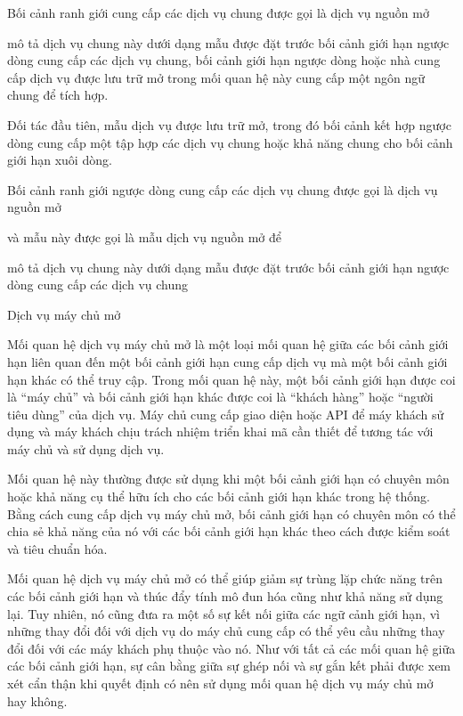 Bối cảnh ranh giới cung cấp các dịch vụ chung được gọi là dịch vụ nguồn mở

mô tả dịch vụ chung này dưới dạng mẫu được đặt trước bối cảnh giới hạn ngược dòng cung cấp các dịch vụ chung, bối cảnh giới hạn ngược dòng hoặc nhà cung cấp dịch vụ được lưu trữ mở trong mối quan hệ này cung cấp một ngôn ngữ chung để tích hợp.

Đối tác đầu tiên, mẫu dịch vụ được lưu trữ mở, trong đó bối cảnh kết hợp ngược dòng cung cấp một tập hợp các dịch vụ chung hoặc khả năng chung cho bối cảnh giới hạn xuôi dòng.


Bối cảnh ranh giới ngược dòng cung cấp các dịch vụ chung được gọi là dịch vụ nguồn mở

và mẫu này được gọi là mẫu dịch vụ nguồn mở để

mô tả dịch vụ chung này dưới dạng mẫu được đặt trước bối cảnh giới hạn ngược dòng cung cấp các dịch vụ chung





Dịch vụ máy chủ mở

Mối quan hệ dịch vụ máy chủ mở là một loại mối quan hệ giữa các bối cảnh giới hạn liên quan đến một bối cảnh giới hạn cung cấp dịch vụ mà một bối cảnh giới hạn khác có thể truy cập. Trong mối quan hệ này, một bối cảnh giới hạn được coi là “máy chủ” và bối cảnh giới hạn khác được coi là “khách hàng” hoặc “người tiêu dùng” của dịch vụ. Máy chủ cung cấp giao diện hoặc API để máy khách sử dụng và máy khách chịu trách nhiệm triển khai mã cần thiết để tương tác với máy chủ và sử dụng dịch vụ.

Mối quan hệ này thường được sử dụng khi một bối cảnh giới hạn có chuyên môn hoặc khả năng cụ thể hữu ích cho các bối cảnh giới hạn khác trong hệ thống. Bằng cách cung cấp dịch vụ máy chủ mở, bối cảnh giới hạn có chuyên môn có thể chia sẻ khả năng của nó với các bối cảnh giới hạn khác theo cách được kiểm soát và tiêu chuẩn hóa.

Mối quan hệ dịch vụ máy chủ mở có thể giúp giảm sự trùng lặp chức năng trên các bối cảnh giới hạn và thúc đẩy tính mô đun hóa cũng như khả năng sử dụng lại. Tuy nhiên, nó cũng đưa ra một số sự kết nối giữa các ngữ cảnh giới hạn, vì những thay đổi đối với dịch vụ do máy chủ cung cấp có thể yêu cầu những thay đổi đối với các máy khách phụ thuộc vào nó. Như với tất cả các mối quan hệ giữa các bối cảnh giới hạn, sự cân bằng giữa sự ghép nối và sự gắn kết phải được xem xét cẩn thận khi quyết định có nên sử dụng mối quan hệ dịch vụ máy chủ mở hay không.

